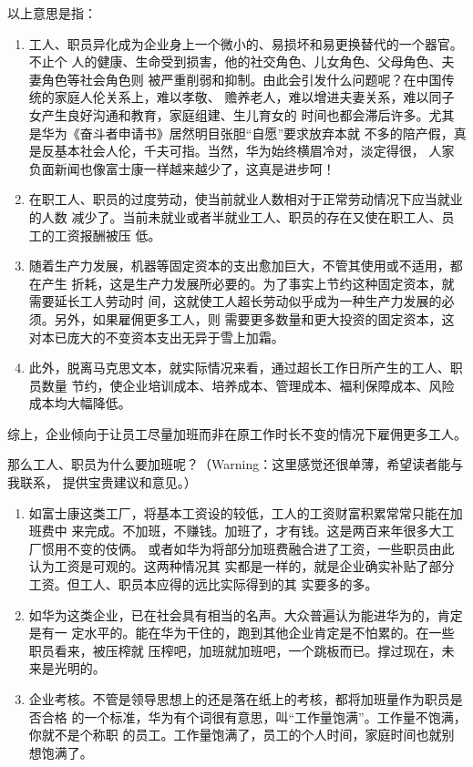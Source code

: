 以上意思是指：
\begin{enumerate}
\item 工人、职员异化成为企业身上一个微小的、易损坏和易更换替代的一个器官。不止个
  人的健康、生命受到损害，他的社交角色、儿女角色、父母角色、夫妻角色等社会角色则
  被严重削弱和抑制。由此会引发什么问题呢？在中国传统的家庭人伦关系上，难以孝敬、
  赡养老人，难以增进夫妻关系，难以同子女产生良好沟通和教育，家庭组建、生儿育女的
  时间也都会滞后许多。尤其是华为《奋斗者申请书》居然明目张胆“自愿”要求放弃本就
  不多的陪产假，真是反基本社会人伦，千夫可指。当然，华为始终横眉冷对，淡定得很，
  人家负面新闻也像富士康一样越来越少了，这真是进步呵！

\item 在职工人、职员的过度劳动，使当前就业人数相对于正常劳动情况下应当就业的人数
  减少了。当前未就业或者半就业工人、职员的存在又使在职工人、员工的工资报酬被压
  低。

\item 随着生产力发展，机器等固定资本的支出愈加巨大，不管其使用或不适用，都在产生
  折耗，这是生产力发展所必要的。为了事实上节约这种固定资本，就需要延长工人劳动时
  间，这就使工人超长劳动似乎成为一种生产力发展的必须。另外，如果雇佣更多工人，则
  需要更多数量和更大投资的固定资本，这对本已庞大的不变资本支出无异于雪上加霜。

\item 此外，脱离马克思文本，就实际情况来看，通过超长工作日所产生的工人、职员数量
  节约，使企业培训成本、培养成本、管理成本、福利保障成本、风险成本均大幅降低。

\end{enumerate}

综上，企业倾向于让员工尽量加班而非在原工作时长不变的情况下雇佣更多工人。

那么工人、职员为什么要加班呢？（Warning：这里感觉还很单薄，希望读者能与我联系，
提供宝贵建议和意见。）
\begin{enumerate}

\item 如富士康这类工厂，将基本工资设的较低，工人的工资财富积累常常只能在加班费中
  来完成。不加班，不赚钱。加班了，才有钱。这是两百来年很多大工厂惯用不变的伎俩。
  或者如华为将部分加班费融合进了工资，一些职员由此认为工资是可观的。这两种情况其
  实都是一样的，就是企业确实补贴了部分工资。但工人、职员本应得的远比实际得到的其
  实要多的多。

\item 如华为这类企业，已在社会具有相当的名声。大众普遍认为能进华为的，肯定是有一
  定水平的。能在华为干住的，跑到其他企业肯定是不怕累的。在一些职员看来，被压榨就
  压榨吧，加班就加班吧，一个跳板而已。撑过现在，未来是光明的。

\item 企业考核。不管是领导思想上的还是落在纸上的考核，都将加班量作为职员是否合格
  的一个标准，华为有个词很有意思，叫“工作量饱满”。工作量不饱满，你就不是个称职
  的员工。工作量饱满了，员工的个人时间，家庭时间也就别想饱满了。

\end{enumerate}

